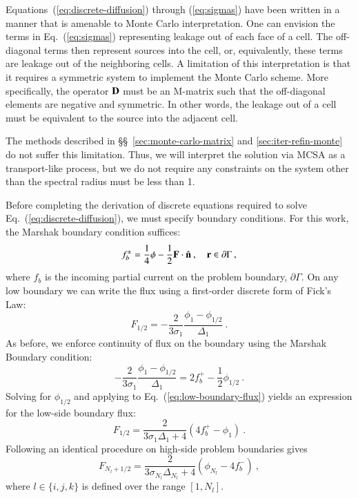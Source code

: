 \documentclass[preprint,12pt]{elsarticle}
\newcommand{\vr}{\ensuremath{\ve{r}}}
\begin{document}
Equations~(\ref{eq:discrete-diffusion}) through (\ref{eq:sigmas}) have been
written in a manner that is amenable to Monte Carlo interpretation.  One can
envision the terms in Eq.~(\ref{eq:sigmas}) representing leakage out of each
face of a cell.  The off-diagonal terms then represent sources into the cell,
or, equivalently, these terms are leakage out of the neighboring cells.  A
limitation of this interpretation is that it requires a symmetric system to
implement the Monte Carlo scheme.  More specifically, the operator $\mathbf{D}$
must be an M-matrix \cite{kelley_1995} such that the off-diagonal elements are
negative and symmetric.  In other words, the leakage out of a cell must be
equivalent to the source into the adjacent cell.

The methods described in \S\S~\ref{sec:monte-carlo-matrix} and
\ref{sec:iter-refin-monte} do not suffer this limitation.  Thus, we will
interpret the solution via MCSA as a transport-like process, but we do not
require any constraints on the system other than the spectral radius must be
less than 1.

Before completing the derivation of discrete equations required to solve
Eq.~(\ref{eq:discrete-diffusion}), we must specify boundary conditions.  For
this work, the Marshak boundary condition suffices:
\begin{equation}
  f_b^\pm = \frac{1}{4}\phi -
  \frac{1}{2}\ve{F}\cdot\hat{\ve{n}}\:,\quad \vr\in \partial\Gamma\:,
\end{equation}
where $f_b$ is the incoming partial current on the problem boundary,
$\partial\Gamma$.  On any low boundary we can write the flux using a
first-order discrete form of Fick's Law:
\begin{equation}
  F_{1/2} = -\frac{2}{3\sigma_1}\frac{\phi_1 -
    \phi_{1/2}}{\Delta_1}\:.
  \label{eq:low-boundary-flux}
\end{equation}
As before, we enforce continuity of flux on the boundary using the
Marshak Boundary condition:
\begin{equation}
  -\frac{2}{3\sigma_1}\frac{\phi_1 - \phi_{1/2}}{\Delta_1} = 2f_b^{+}
  -\frac{1}{2}\phi_{1/2}\:.
\end{equation}
Solving for $\phi_{1/2}$ and applying to Eq.~(\ref{eq:low-boundary-flux})
yields an expression for the low-side boundary flux:
\begin{equation}
  F_{1/2} = \frac{2}{3\sigma_1\Delta_1 + 4}(4f_b^{+}-\phi_1)\:.
\end{equation}
Following an identical procedure on high-side problem boundaries gives
\begin{equation}
  F_{N_l+1/2} = \frac{2}{3\sigma_{N_l}\Delta_{N_l} +
    4}(\phi_{N_l}-4f_b^{-})\:,
\end{equation}
where $l\in\{i,j,k\}$ is defined over the range $[1,N_l]$.
\end{document}
